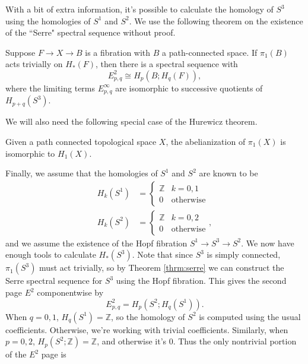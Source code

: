 \documentclass[twoside,10pt]{article}
\begin{document}
\vspace{10mm}

\begin{ex}
	With a bit of extra information, it's possible to calculate the homology of $S^{3}$ using the homologies of $S^{1}$ and $S^{2}$. We use the following theorem on the existence of the ``Serre" spectral sequence without proof.

	 \begin{thrm}[]
		 \label{thrm:serre}
		 Suppose $F\to X\to B$ is a fibration with $B$ a path-connected space. If $\pi_1(B)$ acts trivially on $H_{*}(F)$, then there is a spectral sequence with
		 \[
			 E_{p,q}^{2}\cong H_{p}(B;H_{q}(F)),
		 \] 
		 where the limiting terms $E_{p,q}^{\infty}$ are isomorphic to successive quotients of $H_{p+q}(S^{3})$.
	\end{thrm}
	We will also need the following special case of the Hurewicz theorem.
	\begin{lem}
		\label{lem:hur}
		Given a path connected topological space $X$, the abelianization of $\pi_1(X)$ is isomorphic to $H_{1}(X)$.
	\end{lem}
	Finally, we assume that the homologies of $S^{1}$ and $S^{2}$ are known to be
	\begin{align*}
		H_{k}(S^{1}) &=
		\begin{cases}
			\mathbb{Z}&k=0,1\\
			0&\text{otherwise}
		\end{cases}\\
		H_{k}(S^{2}) &=
                \begin{cases}
                        \mathbb{Z}&k=0,2\\
                        0&\text{otherwise}
                \end{cases},
	\end{align*}
	and we assume the existence of the Hopf fibration $S^{1}\to S^{3}\to S^{2}$. We now have enough tools to calculate $H_{*}(S^{3})$. Note that since $S^{3}$ is simply connected, $\pi_1(S^{3})$ must act trivially, so by Theorem \ref{thrm:serre} we can construct the Serre spectral sequence for $S^{3}$ using the Hopf fibration. This gives the second page $E^{2}$ componentwise by
	\[
		E_{p,q}^{2}= H_{p}(S^{2}; H_{q}(S^{1})).
	\] 
	When $q=0,1$, $H_{q}(S^{1})=\mathbb{Z}$, so the homology of $S^{2}$ is computed using the usual coefficients. Otherwise, we're working with trivial coefficients. Similarly, when $p=0,2$, $H_{p}(S^2;\mathbb{Z})=\mathbb{Z}$, and otherwise it's 0. Thus the only nontrivial portion of the $E^2$ page is

\end{ex}
\end{document}
